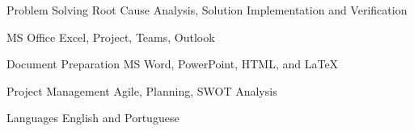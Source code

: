 


\begin{cvskills}


\cvskill
{Problem Solving} %
{Root Cause Analysis, Solution Implementation and Verification} %


\cvskill
{MS Office} %
{Excel, Project, Teams, Outlook} %


\cvskill
{Document Preparation} %
{MS Word, PowerPoint, HTML, and LaTeX } %


\cvskill
{Project Management} %
{Agile, Planning, SWOT Analysis} %


\cvskill
{Languages} %
{English and Portuguese} %


\end{cvskills}
